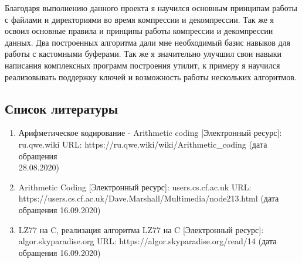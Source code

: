 \documentclass[12pt]{article}
\begin{document}
Благодаря выполнению данного проекта я научился основным принципам работы с файлами и директориями во время компрессии и декомпрессии. Так же я освоил основные правила и принципы работы компрессии и декомпрессии данных. Два построенных алгоритма дали мне необходимый базис навыков для работы с кастомными буферами. Так же я значительно улучшил свои навыки написания комплексных программ  построения утилит, к примеру я научился реализовывать поддержку ключей и возможность работы нескольких алгоритмов.




\subsection*{Список литературы}
\begin{enumerate}
	\item Арифметическое кодирование - Arithmetic coding [Электронный ресурс]:\\ ru.qwe.wiki URL: https://ru.qwe.wiki/wiki/Arithmetic\_coding (дата обращения\\ 28.08.2020)
	\item Arithmetic Coding [Электронный ресурс]: users.cs.cf.ac.uk URL:\\ https://users.cs.cf.ac.uk/Dave.Marshall/Multimedia/node213.html (дата обращения 16.09.2020)
	\item LZ77 на C, реализация алгоритма LZ77 на C [Электронный ресурс]:\\ algor.skyparadise.org URL: https://algor.skyparadise.org/read/14 (дата обращения 16.09.2020)
\end{enumerate}
\end{document}
